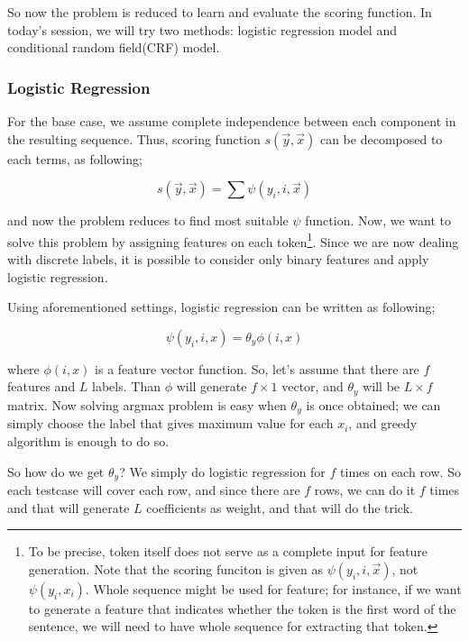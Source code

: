 \documentclass[twoside]{article}
\begin{document}
So now the problem is reduced to learn and evaluate the scoring function. In today's session, we will try two methods: logistic regression model and conditional random field(CRF) model. 

\subsubsection{Logistic Regression} 

For the base case, we assume complete independence between each component in the resulting sequence. Thus, scoring function $s(\vec{y}, \vec{x})$ can be decomposed to each terms, as following; 

\begin{equation} 
s(\vec{y}, \vec{x}) = \sum \psi (y_i, i, \vec{x})
\end{equation}

and now the problem reduces to find most suitable $\psi$ function. Now, we want to solve this problem by assigning features on each token\footnote{To be precise, token itself does not serve as a complete input for feature generation. Note that the scoring funciton is given as $\psi(y_i, i, \vec{x})$, not $\psi(y_i, x_i)$. Whole sequence might be used for feature; for instance, if we want to generate a feature that indicates whether the token is the first word of the sentence, we will need to have whole sequence for extracting that token.}. Since we are now dealing with discrete labels, it is possible to consider only binary features and apply logistic regression. 

Using aforementioned settings, logistic regression can be written as following; 

\begin{equation} 
\psi(y_i, i, x) = \theta_y \phi (i, x)
\end{equation}

where $\phi(i,x)$ is a feature vector function. So, let's assume that there are $f$ features and $L$ labels. Than $\phi$ will generate $f \times 1$ vector, and $\theta_y$ will be $L \times f$ matrix. Now solving argmax problem is easy when $\theta_y$ is once obtained; we can simply choose the label that gives maximum value for each $x_i$, and greedy algorithm is enough to do so. 

So how do we get $\theta_y$? We simply do logistic regression for $f$ times on each row. So each testcase will cover each row, and since there are $f$ rows, we can do it $f$ times and that will generate $L$ coefficients as weight, and that will do the trick. 
\end{document}
